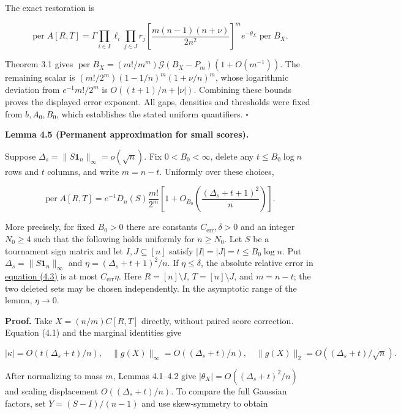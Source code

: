 \documentclass[11pt,a4paper]{article}
\begin{document}
The exact restoration is

\begin{equation}
\operatorname{per}A[R,T]=\Gamma\prod_{i\in I}\ell_i\prod_{j\in J}r_j
\left[\frac{m(n-1)(n+\nu)}{2n^2}\right]^m
 e^{-\theta_X}\operatorname{per}B_X.\tag{4.2}
\label{eq-exact-restoration}
\end{equation}

Theorem 3.1 gives \(\operatorname{per}B_X=(m!/m^m)\mathcal G(B_X-P_m)(1+O(m^{-1}))\). The remaining scalar is \((m!/2^m)(1-1/n)^m(1+\nu/n)^m\), whose logarithmic deviation from \(e^{-1}m!/2^m\) is \(O((t+1)/n+|\nu|)\). Combining these bounds proves the displayed error exponent. All gaps, densities and thresholds were fixed from \(b,A_0,B_0\), which establishes the stated uniform quantifiers. \(\square\)

\textbf{Lemma 4.5 (Permanent approximation for small scores).}

Suppose \(\Delta_s=\|S\mathbf 1_n\|_\infty=o(\sqrt n)\). Fix \(0<B_0<\infty\), delete any \(t\le B_0\log n\) rows and \(t\) columns, and write \(m=n-t\). Uniformly over these choices,

\begin{equation}
\operatorname{per}A[R,T]=e^{-1}D_n(S)\frac{m!}{2^m}\left[1+O_{B_0}\left(\frac{(\Delta_s+t+1)^2}{n}\right)\right].
\tag{4.3}
\label{eq-small-score-permanent}
\end{equation}

More precisely, for fixed \(B_0>0\) there are constants \(C_{\mathrm{err}},\delta>0\) and an integer \(N_0\ge4\) such that the following holds uniformly for \(n\ge N_0\). Let \(S\) be a tournament sign matrix and let \(I,J\subseteq[n]\) satisfy \(|I|=|J|=t\le B_0\log n\). Put \(\Delta_s=\|S\mathbf1_n\|_\infty\) and \(\eta=(\Delta_s+t+1)^2/n\). If \(\eta\le\delta\), the absolute relative error in \hyperref[eq-small-score-permanent]{equation (4.3)} is at most \(C_{\mathrm{err}}\eta\). Here \(R=[n]\setminus I\), \(T=[n]\setminus J\), and \(m=n-t\); the two deleted sets may be chosen independently. In the asymptotic range of the lemma, \(\eta\to0\).

\textbf{Proof.} Take \(X=(n/m)C[R,T]\) directly, without paired score correction. Equation (4.1) and the marginal identities give

\[
|\kappa|=O(t(\Delta_s+t)/n),\quad
\|g(X)\|_\infty=O((\Delta_s+t)/n),\quad
\|g(X)\|_2=O((\Delta_s+t)/\sqrt n).
\]

After normalizing to mass \(m\), Lemmas 4.1--4.2 give \(|\theta_X|=O((\Delta_s+t)^2/n)\) and scaling displacement \(O((\Delta_s+t)/n)\). To compare the full Gaussian factors, set \(Y=(S-I)/(n-1)\) and use skew-symmetry to obtain
\end{document}
